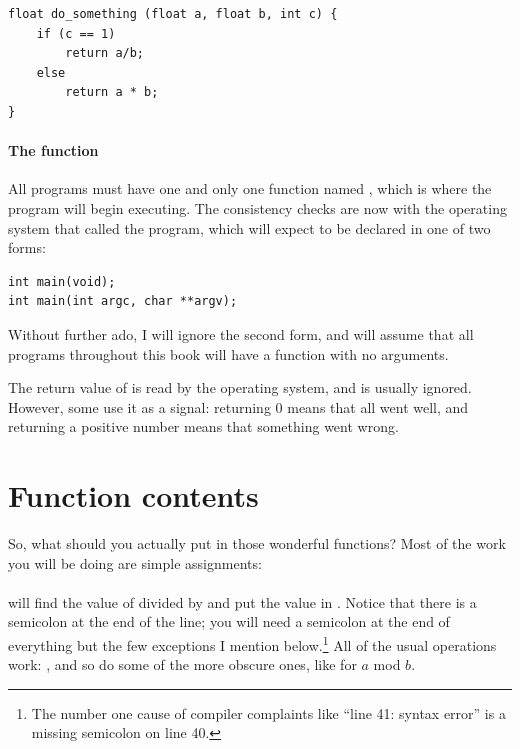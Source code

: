 \documentclass[12pt]{article}
\makeatletter
\def\ind#1{\index{#1}#1}
\def\ttindex#1{\index{#1@\cinline{#1}}}
\makeatother
\begin{document}
\begin{lstlisting}
float do_something (float a, float b, int c) {
    if (c == 1)
        return a/b;
    else
        return a * b;
}
\end{lstlisting}


\paragraph{The  function}\ttindex{main}

All programs must have one and only one function named ,
which is where the program will begin executing. The consistency checks
are now with the operating system that called the program, which will
expect  to be declared in one of two forms:

\begin{lstlisting}
int main(void);
int main(int argc, char **argv);
\end{lstlisting}

Without further ado, I will ignore the second form, and will assume that all programs throughout this
book will have a  function with no arguments.

The return value of  is read by the operating system, and is usually ignored. However, some
use it as a signal:  returning 0 means that all went well, and returning a positive number means that
something went wrong.



\section{Function contents} \label{fncontents}

So, what should you actually put in those wonderful functions? Most of the work you will be doing are
simple assignments:    \index{=}\\
\\
will find the value of  divided by  and put the
value in . Notice that there is a semicolon at the end of
the line; you will need a semicolon at the end of everything but the few
exceptions I mention below.\footnote{The number one cause of compiler
complaints like ``line 41: \ind{syntax error}'' is a missing semicolon on line 40.} All of the usual operations work: \cinline{+
- / *}, and so do some of the more obscure ones, like 
for $a$ mod $b$.  \index{\%}
\end{document}
